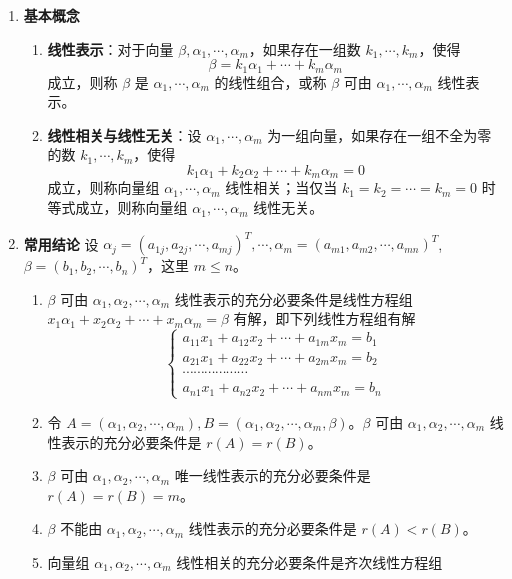 \documentclass[UTF8]{ctexart}
\theoremstyle{mydef}
\begin{document}
\begin{enumerate}
    \item \textbf{基本概念}
    \begin{enumerate}
        \item \textbf{线性表示}：对于向量 $\beta, \alpha_1, \cdots, \alpha_m$，如果存在一组数 $k_1, \cdots, k_m$，使得
        $$ \beta = k_1\alpha_1 + \cdots + k_m\alpha_m $$
        成立，则称 $\beta$ 是 $\alpha_1, \cdots, \alpha_m$ 的线性组合，或称 $\beta$ 可由 $\alpha_1, \cdots, \alpha_m$ 线性表示。
        \item \textbf{线性相关与线性无关}：设 $\alpha_1, \cdots, \alpha_m$ 为一组向量，如果存在一组不全为零的数 $k_1, \cdots, k_m$，使得
        $$ k_1\alpha_1 + k_2\alpha_2 + \cdots + k_m\alpha_m = 0 $$
        成立，则称向量组 $\alpha_1, \cdots, \alpha_m$ 线性相关；当仅当 $k_1 = k_2 = \cdots = k_m = 0$ 时等式成立，则称向量组 $\alpha_1, \cdots, \alpha_m$ 线性无关。
    \end{enumerate}
    \item \textbf{常用结论}
    设 $\alpha_j = (a_{1j}, a_{2j}, \cdots, a_{mj})^T, \cdots, \alpha_m = (a_{m1}, a_{m2}, \cdots, a_{mn})^T$, $\beta = (b_1, b_2, \cdots, b_n)^T$，这里 $m \le n$。
    \begin{enumerate}
        \item $\beta$ 可由 $\alpha_1, \alpha_2, \cdots, \alpha_m$ 线性表示的充分必要条件是线性方程组 $x_1\alpha_1 + x_2\alpha_2 + \cdots + x_m\alpha_m = \beta$ 有解，即下列线性方程组有解
        $$
        \begin{cases}
        a_{11}x_1 + a_{12}x_2 + \cdots + a_{1m}x_m = b_1 \\
        a_{21}x_1 + a_{22}x_2 + \cdots + a_{2m}x_m = b_2 \\
        \cdots \cdots \cdots \cdots \cdots \cdots \\
        a_{n1}x_1 + a_{n2}x_2 + \cdots + a_{nm}x_m = b_n
        \end{cases}
        $$
        \item 令 $A = (\alpha_1, \alpha_2, \cdots, \alpha_m), B = (\alpha_1, \alpha_2, \cdots, \alpha_m, \beta)$。$\beta$ 可由 $\alpha_1, \alpha_2, \cdots, \alpha_m$ 线性表示的充分必要条件是 $r(A) = r(B)$。
        \item $\beta$ 可由 $\alpha_1, \alpha_2, \cdots, \alpha_m$ 唯一线性表示的充分必要条件是 $r(A) = r(B) = m$。
        \item $\beta$ 不能由 $\alpha_1, \alpha_2, \cdots, \alpha_m$ 线性表示的充分必要条件是 $r(A) < r(B)$。
        \item 向量组 $\alpha_1, \alpha_2, \cdots, \alpha_m$ 线性相关的充分必要条件是齐次线性方程组

\end{enumerate}
\end{enumerate}
\end{document}
